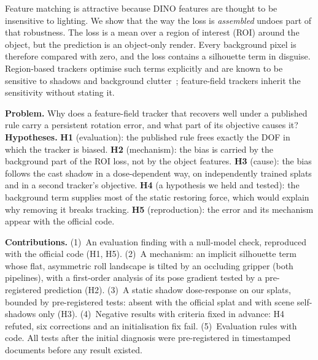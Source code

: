 \documentclass[conference]{IEEEtran}
\begin{document}
Feature matching is attractive because DINO features are thought to be insensitive to lighting. We show that the
way the loss is \emph{assembled} undoes part of that robustness. The loss is a mean over a region of interest (ROI)
around the object, but the prediction is an object-only render. Every background pixel is therefore compared with
zero, and the loss contains a silhouette term in disguise. Region-based trackers optimise such terms explicitly and
are known to be sensitive to shadows and background clutter~\cite{prisacariu2012pwp3d,stoiber2022srt3d}; feature-field
trackers inherit the sensitivity without stating it.

\textbf{Problem.} Why does a feature-field tracker that recovers well under a published rule carry a persistent
rotation error, and what part of its objective causes it? \textbf{Hypotheses.}
\textbf{H1} (evaluation): the published rule frees exactly the DOF in which the tracker is biased.
\textbf{H2} (mechanism): the bias is carried by the background part of the ROI loss, not by the object features.
\textbf{H3} (cause): the bias follows the cast shadow in a dose-dependent way, on independently trained splats and in
a second tracker's objective. \textbf{H4} (a hypothesis we held and tested): the background term supplies most of the
static restoring force, which would explain why removing it breaks tracking. \textbf{H5} (reproduction): the error
and its mechanism appear with the official code.

\textbf{Contributions.} (1)~An evaluation finding with a null-model check, reproduced with the official code
(H1, H5). (2)~A mechanism: an implicit silhouette term whose flat, asymmetric roll landscape is tilted by an occluding
gripper (both pipelines), with a first-order analysis of its pose gradient tested by a pre-registered prediction (H2).
(3)~A static shadow dose-response on our splats, bounded by pre-registered tests: absent with the official splat and
with scene self-shadows only (H3). (4)~Negative results with criteria fixed in advance: H4 refuted, six corrections
and an initialisation fix fail. (5)~Evaluation rules with code. All tests after the initial diagnosis were
pre-registered in timestamped documents before any result existed.
\end{document}
